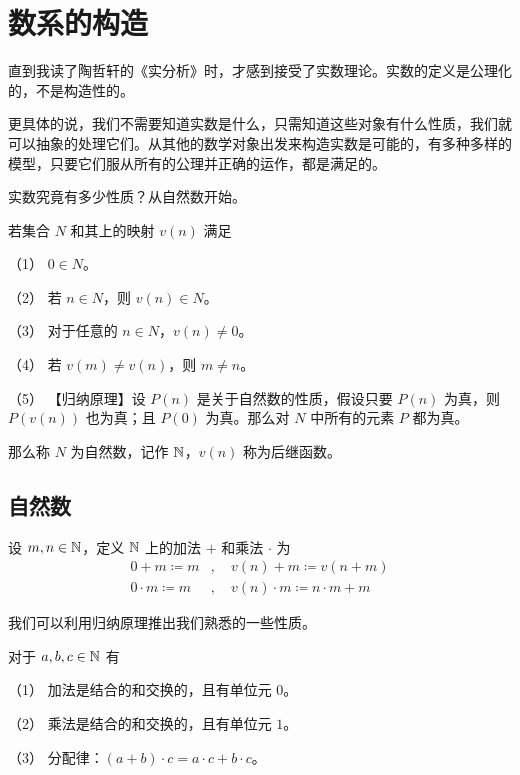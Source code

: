 \section{数系的构造}

直到我读了陶哲轩的《实分析》时，才感到接受了实数理论。实数的定义是公理化的，不是构造性的。

更具体的说，我们不需要知道实数是什么，只需知道这些对象有什么性质，我们就可以抽象的处理它们。从其他的数学对象出发来构造实数是可能的，有多种多样的模型，只要它们服从所有的公理并正确的运作，都是满足的。

实数究竟有多少性质？从自然数开始。

\begin{axiom}[Peano 公理]
	若集合 $N$ 和其上的映射 $v(n)$ 满足

	（1） $0\in N$。

	（2） 若 $n\in N$，则 $v(n) \in N$。

	（3） 对于任意的 $n\in N$，$v(n) \ne 0$。

	（4） 若 $v(m) \ne v(n)$，则 $m\ne n$。

	（5） 【归纳原理】设 $P(n)$ 是关于自然数的性质，假设只要 $P(n)$ 为真，则 $P(v(n))$ 也为真；且 $P(0)$ 为真。那么对 $N$ 中所有的元素 $P$ 都为真。

	那么称 $N$ 为自然数，记作 $\NN$，$v(n)$ 称为后继函数。
\end{axiom}

\subsection{自然数}

设 $m,n\in \mathbb{N}$，定义 $\NN$ 上的加法 $+$ 和乘法 $\cdot$ 为
\begin{equation*}
	\begin{aligned}
		0+m\coloneqq m      & ,\quad v(n)+m\coloneqq v(n+m)             \\
		0\cdot m\coloneqq m & ,\quad v(n)\cdot m\coloneqq n \cdot m + m
	\end{aligned}
\end{equation*}

我们可以利用归纳原理推出我们熟悉的一些性质。

\begin{theorem}[$\NN$ 的代数算律]
	对于 $a,b,c\in \mathbb{N}$ 有

	（1） 加法是结合的和交换的，且有单位元 $0$。

	（2） 乘法是结合的和交换的，且有单位元 $1$。

	（3） 分配律：$(a+b) \cdot  c = a \cdot c + b\cdot c$。
\end{theorem}

